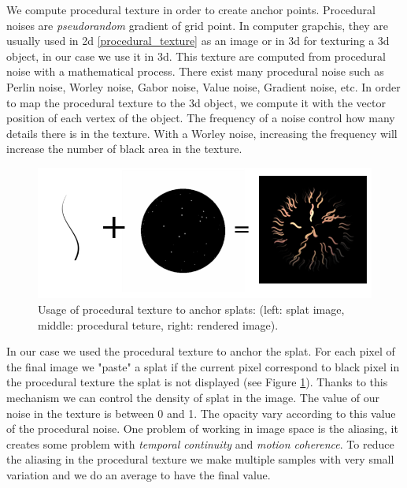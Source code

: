 
We compute procedural texture in order to create anchor points. Procedural noises are \textit{pseudorandom} gradient of grid point. In computer grapchis, they are usually used in 2d \ref{procedural_texture} as an image or in 3d for texturing a 3d object, in our case we use it in 3d. This texture are computed from procedural noise with a mathematical process. There exist many procedural noise such as Perlin noise, Worley noise, Gabor noise, Value noise, Gradient noise, etc. In order to map the procedural texture to the 3d object, we compute it with the vector position of each vertex of the object. The frequency of a noise control how many details there is in the texture. With a Worley noise, increasing the frequency will increase the number of black area in the texture.


\begin{figure}
    \begin{center}
    \includegraphics[scale=0.6]{images/noise/addition.png}
    \end{center}
    \caption{Usage of procedural texture to anchor splats: (left: splat image, middle: procedural teture, right: rendered image).}
    \label{procedural_noise_anchor}
\end{figure}

In our case we used the procedural texture to anchor the splat. For each pixel of the final image we "paste" a splat if the current pixel correspond to black pixel in the procedural texture the splat is not displayed (see Figure \ref{procedural_noise_anchor}). Thanks to this mechanism we can control the density of splat in the image. The value of our noise in the texture is between 0 and 1. The opacity vary according to this value of the procedural noise. One problem of working in image space is the aliasing, it creates some problem with \textit{temporal continuity} and \textit{motion coherence}. To reduce the aliasing in the procedural texture we make multiple samples with very small variation and we do an average to have the final value.

